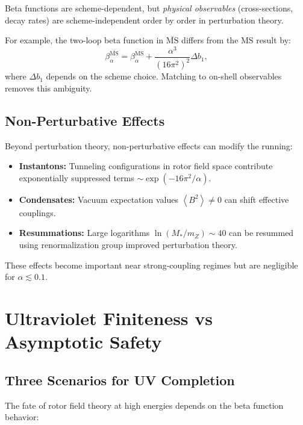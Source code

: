 \documentclass[11pt,a4paper]{article}
\numberwithin{equation}{section}
\theoremstyle{plain}
\theoremstyle{definition}
\theoremstyle{remark}
\newcommand{\avg}[1]{\left\langle #1 \right\rangle}
\begin{document}
Beta functions are scheme-dependent, but \emph{physical observables} (cross-sections, decay rates) are scheme-independent order by order in perturbation theory.

For example, the two-loop beta function in $\overline{\text{MS}}$ differs from the MS result by:
\begin{equation}
\beta_\alpha^{\overline{\text{MS}}} = \beta_\alpha^{\text{MS}} + \frac{\alpha^3}{(16\pi^2)^2}\Delta b_1,
\label{eq:beta-scheme}
\end{equation}
where $\Delta b_1$ depends on the scheme choice. Matching to on-shell observables removes this ambiguity.

\subsection{Non-Perturbative Effects}

Beyond perturbation theory, non-perturbative effects can modify the running:
\begin{itemize}
  \item \textbf{Instantons:} Tunneling configurations in rotor field space contribute exponentially suppressed terms $\sim \exp(-16\pi^2/\alpha)$.
  \item \textbf{Condensates:} Vacuum expectation values $\avg{B^2}\neq 0$ can shift effective couplings.
  \item \textbf{Resummations:} Large logarithms $\ln(M_*/m_Z)\sim 40$ can be resummed using renormalization group improved perturbation theory.
\end{itemize}

These effects become important near strong-coupling regimes but are negligible for $\alpha\lesssim 0.1$.

\vspace{1em}

\section{Ultraviolet Finiteness vs Asymptotic Safety}\label{sec:UV}

\subsection{Three Scenarios for UV Completion}

The fate of rotor field theory at high energies depends on the beta function behavior:
\end{document}
